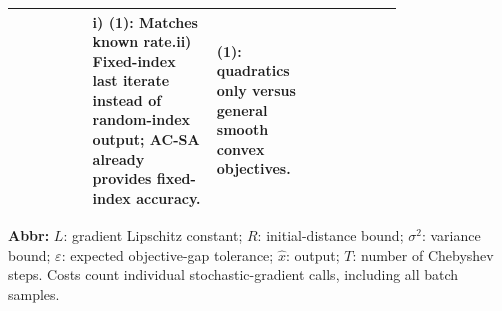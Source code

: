\begin{table}[tp]
\begin{threeparttable}
\begin{tabularx}{\linewidth}{@{}>{\raggedright\arraybackslash}p{0.20\linewidth}>{\raggedright\arraybackslash}p{0.32\linewidth}>{\raggedright\arraybackslash}p{0.25\linewidth}>{\raggedright\arraybackslash}X@{}}
& i) \textbf{(1)}: Matches known rate.\newline ii) Fixed-index last iterate instead of random-index output; AC-SA already provides fixed-index accuracy.
& \textbf{(1)}: quadratics only versus general smooth convex objectives. \\
\bottomrule
\end{tabularx}
\begin{tablenotes}[flushleft]\footnotesize
\item[] \textbf{Abbr:} $L$: gradient Lipschitz constant; $R$: initial-distance bound; $\sigma^2$: variance bound; $\varepsilon$: expected objective-gap tolerance; $\widehat x$: output; $T$: number of Chebyshev steps. Costs count individual stochastic-gradient calls, including all batch samples.
\end{tablenotes}
\end{threeparttable}
\end{table}
\clearpage
